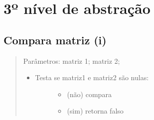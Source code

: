 \documentclass[letterpaper,10pt,openany,oneside,portuges]{sphinxmanual}
\begin{document}
\section{3º nível de abstração}
\label{\detokenize{pseudo:id1}}

\subsection{Compara matriz (i)}
\label{\detokenize{pseudo:compara-matriz-i}}\begin{quote}

Parâmetros: matriz 1; matriz 2;
\begin{itemize}
\item {} \begin{description}
\item[{Testa se matriz1 e matriz2 são nulas:}] \leavevmode\begin{itemize}
\item {} 
(não) compara

\item {} 
(sim) retorna falso

\end{itemize}

\end{description}

\end{itemize}
\end{quote}



\renewcommand{\indexname}{Índice}
\printindex
\end{document}
